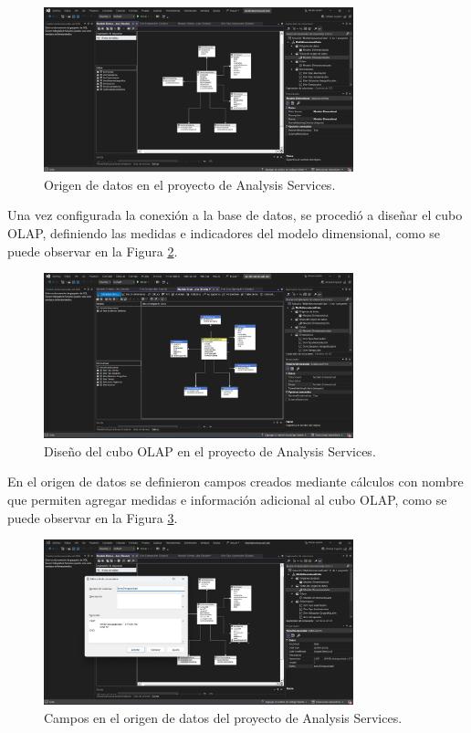 \begin{figure}[H]
    \centering
    \includegraphics[width=0.8\textwidth]{chapters/III-resultados-y-discusion/resources/images/origen-datos-olap.png}
    \caption{Origen de datos en el proyecto de Analysis Services.}
    \label{fig:origen-datos-olap}
\end{figure}

Una vez configurada la conexión a la base de datos, se procedió a diseñar el cubo OLAP, definiendo las medidas e indicadores
del modelo dimensional, como se puede observar en la Figura \ref{fig:cubo-olap}.

\begin{figure}[H]
    \centering
    \includegraphics[width=0.8\textwidth]{chapters/III-resultados-y-discusion/resources/images/cubo-olap.png}
    \caption{Diseño del cubo OLAP en el proyecto de Analysis Services.}
    \label{fig:cubo-olap}
\end{figure}

En el origen de datos se definieron campos creados mediante cálculos con nombre que permiten agregar medidas e información
adicional al cubo OLAP, como se puede observar en la Figura \ref{fig:campos-origen-datos-olap}.

\begin{figure}[H]
    \centering
    \includegraphics[width=0.8\textwidth]{chapters/III-resultados-y-discusion/resources/images/campos-origen-datos-olap.png}
    \caption{Campos en el origen de datos del proyecto de Analysis Services.}
    \label{fig:campos-origen-datos-olap}
\end{figure}

